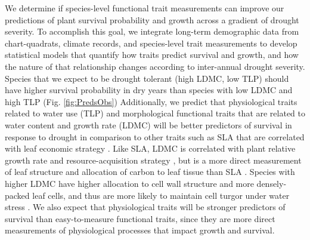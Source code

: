 \documentclass[12pt, letterpaper]{article}
\begin{document}
We determine if species-level functional trait measurements can improve our predictions of plant survival probability and growth across a gradient of drought severity. To accomplish this goal, we integrate long-term demographic data from chart-quadrats, climate records, and species-level trait measurements to develop statistical models that quantify how traits predict survival and growth, and how the nature of that relationship changes according to inter-annual drought severity. 
Species that we expect to be drought tolerant (high LDMC, low TLP) should have higher survival probability in dry years than species with low LDMC and high TLP (Fig. \ref{fig:PredsObs}) Additionally, we predict that physiological traits related to water use (TLP) and morphological functional traits that are related to water content and growth rate (LDMC) will be better predictors of survival in response to drought in comparison to other traits such as SLA that are correlated with leaf economic strategy \citep{Wright2004, Reich2014}. Like SLA, LDMC is correlated with plant relative growth rate and resource-acquisition strategy \citep{Weiher1999ChallengingEcology}, but is a more direct measurement of leaf structure and allocation of carbon to leaf tissue than SLA \citep{Niinemets1999ComponentsPlants,Hodgson2011}. Species with higher LDMC have higher allocation to cell wall structure and more densely-packed leaf cells, and thus are more likely to maintain cell turgor under water stress \citep{Niinemets2001Global-scaleShrubs,Poorter2009CausesMeta-analysis,Wilcox2020PlantPrairie}.%
We also expect that physiological traits will be stronger predictors of survival than easy-to-measure functional traits, since they are more direct measurements of physiological processes that impact growth and survival. 
\end{document}
